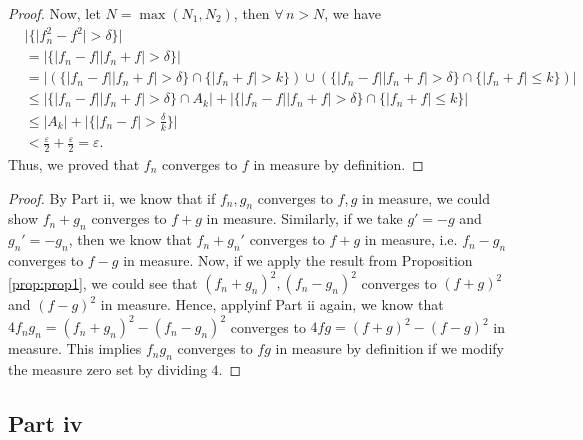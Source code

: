 \begin{answer}
\begin{proof}
        Now, let $N = \max(N_1,N_2)$, then $\forall \, n > N$, we have
        \begin{equation}
            \begin{aligned}
                &\lvert \{\lvert f_n^2 - f^2 \rvert > \delta\}\rvert\\
                &= \lvert \{\lvert f_n - f \rvert \lvert f_n + f \rvert > \delta\}\rvert\\
                &= \lvert \left (\{\lvert f_n - f \rvert \lvert f_n + f \rvert > \delta\} \cap \{\lvert f_n + f \rvert > k\} \right) \cup \left(\{\lvert f_n - f \rvert \lvert f_n + f \rvert > \delta\} \cap \{\lvert f_n + f \rvert \leq k\}\right) \rvert\\
                &\leq \lvert \{\lvert f_n - f \rvert \lvert f_n + f \rvert > \delta\} \cap A_k \rvert + \lvert \{\lvert f_n - f \rvert \lvert f_n + f \rvert > \delta\} \cap \{\lvert f_n + f \rvert \leq k\} \rvert\\
                &\leq \lvert A_k \rvert + \lvert \{\vert f_n - f \rvert > \tfrac{\delta}{k}\} \rvert\\
                &< \tfrac{\varepsilon}{2} + \tfrac{\varepsilon}{2} = \varepsilon.
            \end{aligned}
        \end{equation}
        Thus, we proved that $f_n$ converges to $f$ in measure by definition.
    \end{proof}
    \begin{proof}
        By Part ii, we know that if $f_n,g_n$ converges to $f,g$ in measure, we could show $f_n+g_n$ converges to $f + g$ in measure. Similarly, if we take $g' = -g$ and $g_n' = -g_n$, then we know that $f_n + g_n'$ converges to $f+g$ in measure, i.e. $f_n-g_n$ converges to $f-g$ in measure. Now, if we apply the result from Proposition \ref{prop:prop1}, we could see that $(f_n+g_n)^2, (f_n-g_n)^2$ converges to $(f+g)^2$ and $(f-g)^2$ in measure. Hence, applyinf Part ii again, we know that $4f_ng_n = (f_n+g_n)^2-(f_n-g_n)^2$ converges to $4fg = (f+g)^2 - (f-g)^2$ in measure. This implies $f_ng_n$ converges to $fg$ in measure by definition if we modify the measure zero set by dividing $4$.
    \end{proof}
\end{answer}

\subsection{Part iv}

